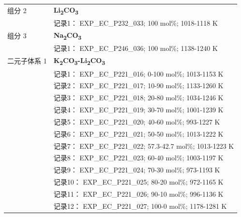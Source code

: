 \documentclass[12pt]{article}
\begin{document}
{\begin{longtable}[]{@{}
  >{\raggedright\arraybackslash}p{}
  >{\raggedright\arraybackslash}p{}@{}}
组分 2  & \textbf{Li\textsubscript{2}CO\textsubscript{3}} \\
 & 记录1： EXP\_EC\_P232\_033; 100 mol\%; 1018-1118 K  \\

组分 3  & \textbf{Na\textsubscript{2}CO\textsubscript{3}} \\
 & 记录1： EXP\_EC\_P246\_036; 100 mol\%; 1138-1240 K  \\

二元子体系 1  & \textbf{K\textsubscript{2}CO\textsubscript{3}-Li\textsubscript{2}CO\textsubscript{3}} \\
 & 记录1： EXP\_EC\_P221\_016; 0-100 mol\%; 1013-1153 K \\
 & 记录2： EXP\_EC\_P221\_017; 10-90 mol\%; 1133-1260 K \\
 & 记录3： EXP\_EC\_P221\_018; 20-80 mol\%; 1034-1246 K \\
 & 记录4： EXP\_EC\_P221\_019; 30-70 mol\%; 1001-1239 K \\
 & 记录5： EXP\_EC\_P221\_020; 40-60 mol\%; 993-1227 K \\
 & 记录6： EXP\_EC\_P221\_021; 50-50 mol\%; 1013-1222 K \\
 & 记录7： EXP\_EC\_P221\_022; 57.3-42.7 mol\%; 1013-1223 K \\
 & 记录8： EXP\_EC\_P221\_023; 60-40 mol\%; 1003-1197 K \\
 & 记录9： EXP\_EC\_P221\_024; 70-30 mol\%; 973-1193 K \\
 & 记录10： EXP\_EC\_P221\_025; 80-20 mol\%; 972-1165 K \\
 & 记录11： EXP\_EC\_P221\_026; 90-10 mol\%; 996-1136 K \\
 & 记录12： EXP\_EC\_P221\_027; 100-0 mol\%; 1178-1281 K  \\


\end{longtable}}
\end{document}
